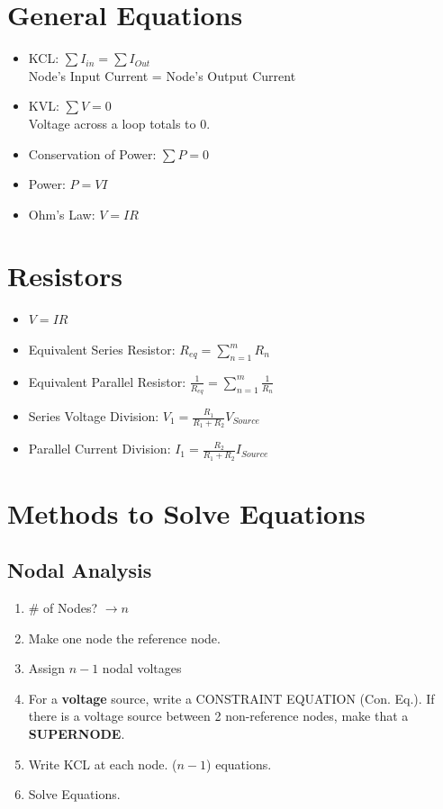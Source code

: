 \documentclass[10pt,letterpaper,twoside,notitlepage]{article}
\author{Karl Hallsby}
\begin{document}
\section*{General Equations}
	\begin{itemize}
		\item KCL: $\sum I_{in} = \sum I_{Out}$ \\
			Node's Input Current = Node's Output Current
		\item KVL: $\sum V = 0$ \\
			Voltage across a loop totals to 0.
		\item Conservation of Power: $\sum P = 0$
		\item Power: $P=VI$
		\item Ohm's Law: $V=IR$
	\end{itemize}

\section*{Resistors}
	\begin{itemize}
		\item $V=IR$
		\item Equivalent Series Resistor: $R_{eq} = \sum_{n=1}^{m}R_n$
		\item Equivalent Parallel Resistor: $\frac{1}{R_{eq}} = \sum_{n=1}^{m}\frac{1}{R_n}$
		\item Series Voltage Division: $V_1=\frac{R_1}{R_1+R_2}V_{Source}$
		\item Parallel Current Division: $I_1=\frac{R_2}{R_1+R_2}I_{Source}$
	\end{itemize}

\section*{Methods to Solve Equations}
	\subsection*{Nodal Analysis}
		\begin{enumerate}
			\item \# of Nodes? $\rightarrow n$
			\item Make one node the reference node.
			\item Assign $n-1$ nodal voltages
			\item For a \textbf{voltage} source, write a CONSTRAINT EQUATION (Con. Eq.). If there is a voltage source between 2 non-reference nodes, make that a \textbf{SUPERNODE}.
			\item Write KCL at each node. ($n-1$) equations.
			\item Solve Equations.
		\end{enumerate}
\end{document}
